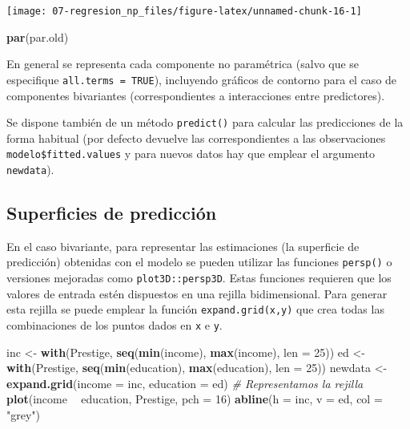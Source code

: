 \documentclass[
]{book}
\newenvironment{Shaded}{\begin{snugshade}}{\end{snugshade}}
\newcommand{\CommentTok}[1]{\textcolor[rgb]{0.56,0.35,0.01}{\textit{#1}}}
\newcommand{\DataTypeTok}[1]{\textcolor[rgb]{0.13,0.29,0.53}{#1}}
\newcommand{\DecValTok}[1]{\textcolor[rgb]{0.00,0.00,0.81}{#1}}
\newcommand{\KeywordTok}[1]{\textcolor[rgb]{0.13,0.29,0.53}{\textbf{#1}}}
\newcommand{\NormalTok}[1]{#1}
\newcommand{\OperatorTok}[1]{\textcolor[rgb]{0.81,0.36,0.00}{\textbf{#1}}}
\newcommand{\StringTok}[1]{\textcolor[rgb]{0.31,0.60,0.02}{#1}}
\theoremstyle{break}
\theoremstyle{definition}
\theoremstyle{definition}
\theoremstyle{definition}
\theoremstyle{remark}
\begin{document}
\begin{center}\texttt{[image: 07-regresion\_np\_files/figure-latex/unnamed-chunk-16-1]} \end{center}

\begin{Shaded}
\begin{Highlighting}[]
\KeywordTok{par}\NormalTok{(par.old)}
\end{Highlighting}
\end{Shaded}

En general se representa cada componente no paramétrica (salvo que se especifique \texttt{all.terms\ =\ TRUE}), incluyendo gráficos de contorno para el caso de componentes bivariantes (correspondientes a interacciones entre predictores).

Se dispone también de un método \texttt{predict()} para calcular las predicciones de la forma habitual (por defecto devuelve las correspondientes a las observaciones \texttt{modelo\$fitted.values} y para nuevos datos hay que emplear el argumento \texttt{newdata}).

\hypertarget{superficies-de-predicciuxf3n}{%
\subsection{Superficies de predicción}\label{superficies-de-predicciuxf3n}}

En el caso bivariante, para representar las estimaciones (la superficie de predicción) obtenidas con el modelo se pueden utilizar las funciones \texttt{persp()} o versiones mejoradas como \texttt{plot3D::persp3D}.
Estas funciones requieren que los valores de entrada estén dispuestos en una rejilla bidimensional.
Para generar esta rejilla se puede emplear la función \texttt{expand.grid(x,y)} que crea todas las combinaciones de los puntos dados en \texttt{x} e \texttt{y}.

\begin{Shaded}
\begin{Highlighting}[]
\NormalTok{inc <-}\StringTok{ }\KeywordTok{with}\NormalTok{(Prestige, }\KeywordTok{seq}\NormalTok{(}\KeywordTok{min}\NormalTok{(income), }\KeywordTok{max}\NormalTok{(income), }\DataTypeTok{len =} \DecValTok{25}\NormalTok{))}
\NormalTok{ed <-}\StringTok{ }\KeywordTok{with}\NormalTok{(Prestige, }\KeywordTok{seq}\NormalTok{(}\KeywordTok{min}\NormalTok{(education), }\KeywordTok{max}\NormalTok{(education), }\DataTypeTok{len =} \DecValTok{25}\NormalTok{))}
\NormalTok{newdata <-}\StringTok{ }\KeywordTok{expand.grid}\NormalTok{(}\DataTypeTok{income =}\NormalTok{ inc, }\DataTypeTok{education =}\NormalTok{ ed)}
\CommentTok{# Representamos la rejilla}
\KeywordTok{plot}\NormalTok{(income }\OperatorTok{~}\StringTok{ }\NormalTok{education, Prestige, }\DataTypeTok{pch =} \DecValTok{16}\NormalTok{)}
\KeywordTok{abline}\NormalTok{(}\DataTypeTok{h =}\NormalTok{ inc, }\DataTypeTok{v =}\NormalTok{ ed, }\DataTypeTok{col =} \StringTok{"grey"}\NormalTok{)}
\end{Highlighting}
\end{Shaded}
\end{document}
